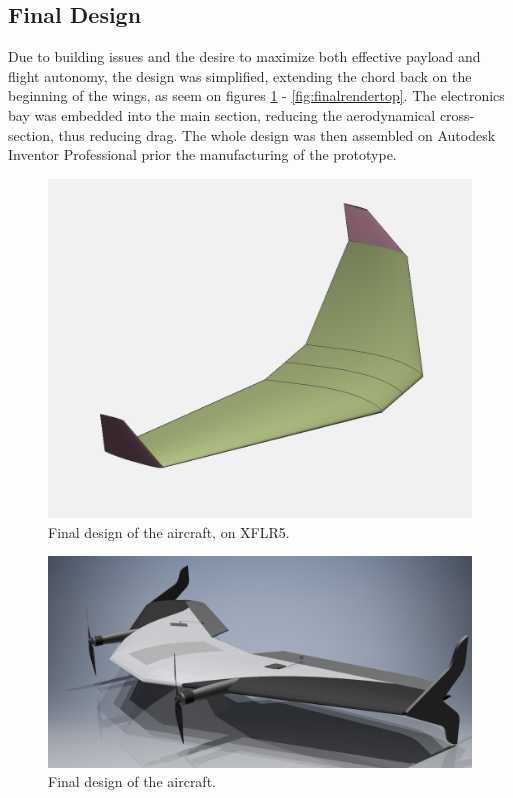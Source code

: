 \subsection{Final Design}

Due to building issues and the desire to maximize both effective payload and flight autonomy, the design was simplified, extending the chord back on the beginning of the wings, as seem on figures \ref{fig:final} - \ref{fig:finalrendertop}.
The electronics bay was embedded into the main section, reducing the aerodynamical cross-section, thus reducing drag. The whole design was then assembled on Autodesk Inventor Professional prior the manufacturing of the prototype.
	

\begin{figure}
\centering
  \includegraphics[width=\linewidth]{figs/final.png}
  \caption{Final design of the aircraft, on XFLR5.}
  \label{fig:final}
\end{figure}
	
\begin{figure}
\centering
  \includegraphics[width=\linewidth]{figs/finalrender.png}
  \caption{Final design of the aircraft.}
  \label{fig:finalrender}
\end{figure}

